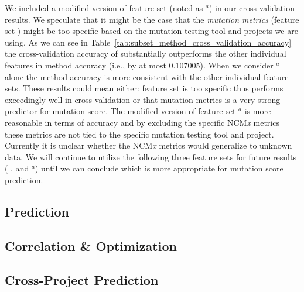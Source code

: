 We included a modified version of feature set  (noted as $^a$) in our cross-validation results. We speculate that it might be the case that the \emph{mutation metrics} (feature set ) might be too specific based on the mutation testing tool and projects we are using. As we can see in Table~\ref{tab:subset_method_cross_validation_accuracy} the cross-validation accuracy of  substantially outperforms the other individual features in method accuracy (i.e., by at most 0.107005). When we consider $^a$ alone the method accuracy is more consistent with the other individual feature sets. These results could mean either: feature set  is too specific thus performs exceedingly well in cross-validation or that mutation metrics is a very strong predictor for mutation score. The modified version of feature set $^a$ is more reasonable in terms of accuracy and by excluding the specific NCM\emph{x} metrics these metrics are not tied to the specific mutation testing tool and project. Currently it is unclear whether the NCM\emph{x} metrics would generalize to unknown data. We will continue to utilize the following three feature sets for future results (   ,      and     $^a$) until we can conclude which is more appropriate for mutation score prediction.


\subsection{Prediction}
\label{subsec:experiment_prediction}


\subsection{Correlation \& Optimization}
\label{subsec:experiment_correlation_optimization}


\subsection{Cross-Project Prediction}
\label{subsec:experiment_cross_project_prediction}


